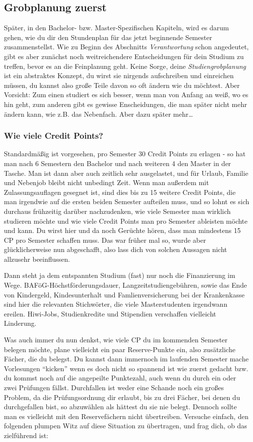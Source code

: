 \label{grob}\subsection{Grobplanung zuerst}
Später, in den Bachelor- bzw. Master-Spezifischen Kapiteln, wird es darum gehen, wie du dir den Stundenplan für das jetzt beginnende Semester zusammenstellst. Wie zu Beginn des Abschnitts \textit{Verantwortung} schon angedeutet, gibt es aber zunächst noch weitreichendere Entscheidungen für dein Studium zu treffen, bevor es an die Feinplanung geht. Keine Sorge, deine \textit{Studiengrobplanung} ist ein abstraktes Konzept, du wirst sie nirgends aufschreiben und einreichen müssen, du kannst also große Teile davon so oft ändern wie du möchtest. Aber Vorsicht: Zum einen studiert es sich besser, wenn man von Anfang an weiß, wo es hin geht, zum anderen gibt es gewisse Enscheidungen, die man später nicht mehr ändern kann, wie z.B. das Nebenfach. Aber dazu später mehr\ldots

\subsubsection{Wie viele Credit Points?}
Standardmäßig ist vorgesehen, pro Semester 30 Credit Points zu erlagen
- so hat man nach 6 Semestern den Bachelor und nach weiteren 4 den Master  in der Tasche. Man ist dann aber auch zeitlich sehr ausgelastet, und für Urlaub, Familie und Nebenjob bleibt nicht unbedingt Zeit. Wenn man außerdem mit Zulassungsauflagen gesegnet ist, sind dies bis zu 15 weitere Credit Points, die man irgendwie auf die ersten beiden Semester aufteilen muss, und so lohnt es sich durchaus frühzeitig darüber nachzudenken, wie viele Semester man wirklich studieren möchte und wie viele Credit Points man pro Semester ableisten möchte und kann. Du wirst hier und da noch Gerüchte hören, dass man mindestens 15 CP pro Semester schaffen muss. Das war früher mal so, wurde aber glücklicherweise nun abgeschafft, also lass dich von solchen Aussagen nicht allzusehr beeinflussen.

Dann steht ja dem entspannten Studium (fast) nur noch die Finanzierung im Wege. BAFöG-Höchstförderungsdauer, Langzeitstudiengebühren, sowie das Ende von Kindergeld, Kindesunterhalt und Famlienversicherung bei der Krankenkasse sind hier die relevanten Stichwörter, die viele Masterstudenten irgendwann ereilen. Hiwi-Jobs, Studienkredite und Stipendien verschaffen vielleicht Linderung.

Was auch immer du nun denkst, wie viele CP du im kommenden Semester belegen möchte, plane vielleicht ein paar Reserve-Punkte ein, also zusätzliche Fächer, die du belegst. Du kannst dann immernoch im laufenden Semester mache Vorlesungen "`kicken"' wenn es doch nicht so spannend ist wie zuerst gedacht bzw. du kommst noch auf die angepeilte Punktezahl, auch wenn du durch ein oder zwei Prüfungen fällst. Durchfallen ist weder eine Schande noch ein großes Problem, da die Prüfungsordnung dir erlaubt, bis zu drei Fächer, bei denen du durchgefallen bist, so abzuwählen als hättest du sie nie belegt. Dennoch sollte man es vielleicht mit den Reservefächern nicht übertreiben. Versuche einfach, den folgenden plumpen Witz auf diese Situation zu übertragen, und frag dich, ob das zielführend ist:


